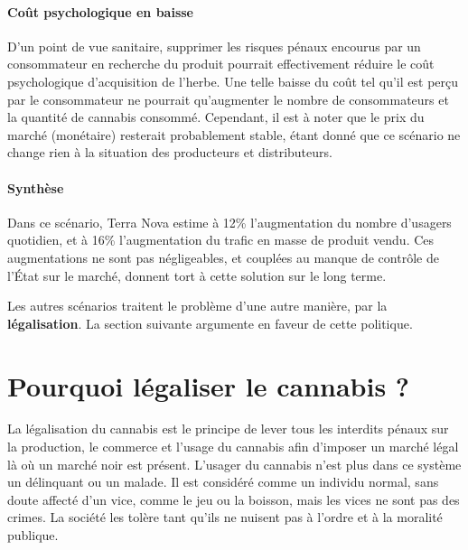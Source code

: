     \paragraph{Coût psychologique en baisse} D’un point de vue sanitaire, supprimer les risques pénaux encourus par un consommateur en recherche du produit pourrait effectivement réduire le coût psychologique d’acquisition de l’herbe. Une telle baisse du coût tel qu’il est perçu par le consommateur ne pourrait qu’augmenter le nombre de consommateurs et la quantité de cannabis consommé. Cependant, il est à noter que le prix du marché (monétaire) resterait probablement stable, étant donné que ce scénario ne change rien à la situation des producteurs et distributeurs.

    \paragraph{Synthèse} Dans ce scénario, Terra Nova estime à 12\% l’augmentation du nombre d’usagers quotidien, et à 16\% l’augmentation du trafic en masse de produit vendu. Ces augmentations ne sont pas négligeables, et couplées au manque de contrôle de l'État sur le marché, donnent tort à cette solution sur le long terme.
    
    Les autres scénarios traitent le problème d'une autre manière, par la \textbf{légalisation}. La section suivante argumente en faveur de cette politique.





 
\section{Pourquoi légaliser le cannabis ?}
 
La légalisation du cannabis est le principe de lever tous les interdits pénaux sur la production, le commerce et l’usage du cannabis afin d’imposer un marché légal là où un marché noir est présent. L’usager du cannabis n’est plus dans ce système un délinquant ou un malade. Il est considéré comme un individu normal, sans doute affecté d’un vice, comme le jeu ou la boisson, mais les vices ne sont pas des crimes. La société les tolère tant qu’ils ne nuisent pas à l’ordre et à la moralité publique.


